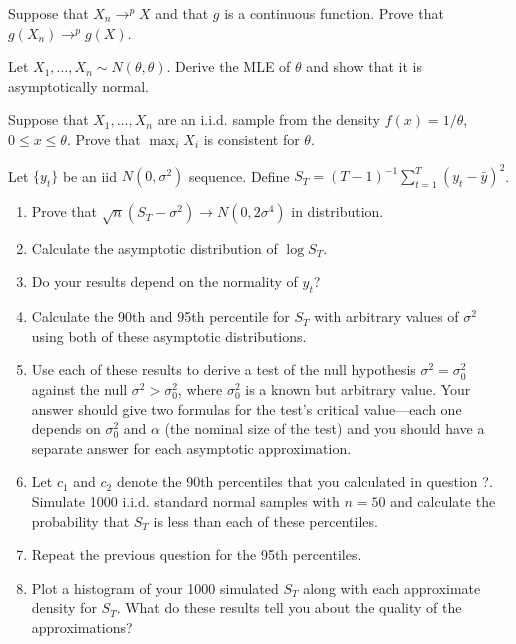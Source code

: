 \begin{hw}
  Suppose that $X_n \to^p X$ and that $g$ is a continuous function.
  Prove that $g(X_n) \to^p g(X)$.
\end{hw}

\begin{hw}
  Let $X_1,\dots,X_n \sim N(\theta, \theta)$. Derive the MLE of
  $\theta$ and show that it is asymptotically normal.
\end{hw}

\begin{hw}
  Suppose that $X_1,\dots,X_n$ are an i.i.d. sample from the density
  $f(x) = 1/\theta$, $0 \leq x \leq \theta$. Prove that $\max_i X_i$
  is consistent for $\theta$.
\end{hw}

\begin{hw}
  Let $\{y_t\}$ be an iid $N(0,\sigma^2)$ sequence. Define $S_T =
  (T-1)^{-1} \sum_{t=1}^T (y_t - \bar y)^2$.
  \begin{enumerate}
  \item Prove that $\sqrt{n} (S_T - \sigma^2) \to N(0,2\sigma^4)$ in
    distribution.
  \item Calculate the asymptotic distribution of $\log S_T$.
  \item Do your results depend on the normality of $y_t$?
  \item Calculate the 90th and 95th percentile for $S_T$ with
    arbitrary values of $\sigma^2$ using both of these asymptotic
    distributions.
  \item Use each of these results to derive a test of the null
    hypothesis $\sigma^2 = \sigma_0^2$ against the null $\sigma^2 >
    \sigma_0^2$, where $\sigma_0^2$ is a known but arbitrary value.
    Your answer should give two formulas for the test's critical
    value---each one depends on $\sigma_0^2$ and $\alpha$ (the nominal
    size of the test) and you should have a separate answer for each
    asymptotic approximation.
  \item Let $c_1$ and $c_2$ denote the 90th percentiles that you
    calculated in question ?. Simulate 1000 i.i.d. standard normal
    samples with $n = 50$ and calculate the probability that $S_T$ is
    less than each of these percentiles.
  \item Repeat the previous question for the 95th percentiles.
  \item Plot a histogram of your 1000 simulated $S_T$ along with each
    approximate density for $S_T$. What do these results tell you
    about the quality of the approximations?

\end{enumerate}
\end{hw}
